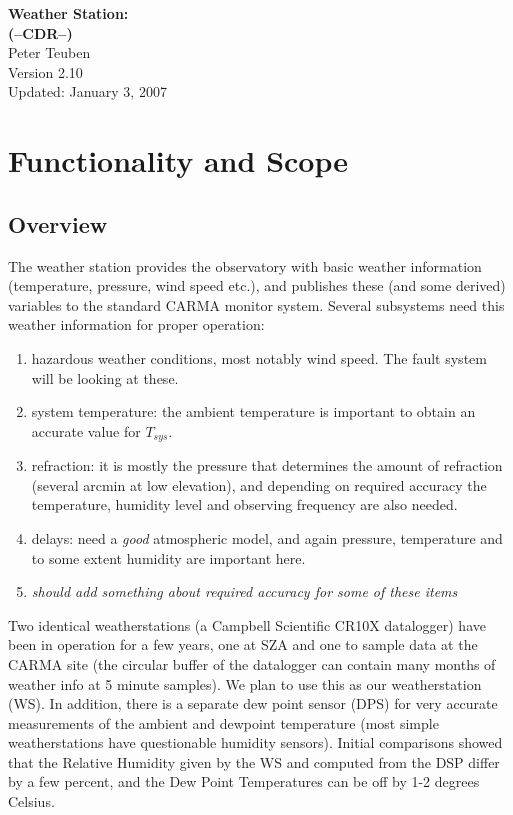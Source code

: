 \documentclass[11pt]{article}
\begin{document}
\begin{center}
{\LARGE\bf Weather Station:\\
(--CDR--)}\\
Peter Teuben \\
Version 2.10\\
Updated: January 3, 2007
\end{center}


\section{Functionality and Scope}

\subsection{Overview} 

The weather station provides the observatory with basic weather
information (temperature, pressure, wind speed etc.), and
publishes these (and some derived) variables  to the
standard CARMA monitor system. Several subsystems need this weather
information for proper operation:

\begin{enumerate}

\item hazardous weather conditions, most notably wind speed. The fault
system will be looking at these.

\item system temperature: the ambient temperature is important to
obtain an accurate value for $T_{sys}$.

\item refraction: it is mostly the pressure that 
determines the amount of refraction (several arcmin at low
elevation), and depending on required accuracy the temperature,
humidity level and observing frequency are also needed.

\item delays: need a {\it good} atmospheric model, and again pressure, 
temperature and to some extent humidity are important here.

\item {\it should add something about required accuracy for
some of these items}
\end{enumerate}

Two identical weatherstations (a Campbell Scientific CR10X datalogger)
have been in operation for a few years, one at SZA and one
to sample data at the CARMA site
(the circular buffer of the datalogger can contain many months of
weather info at 5 minute samples).
We plan to use this as our weatherstation (WS).
In addition, there is a separate 
dew point sensor (DPS) for very accurate measurements of the
ambient and dewpoint temperature (most simple weatherstations
have questionable humidity sensors).  Initial comparisons showed
that the Relative Humidity given by the WS and computed from the DSP
differ by a few percent, and the Dew Point Temperatures can be
off by 1-2 degrees Celsius.
\end{document}
